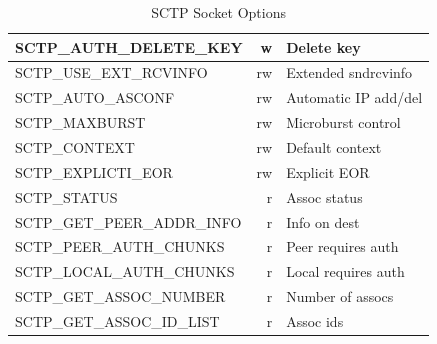\documentclass[conference]{IEEEtran}
\begin{document}
\begin{table}[h]
\begin{center}
\begin{tabular}{|l|r|l|}
SCTP\_AUTH\_DELETE\_KEY         & w   & Delete key               \\\hline
SCTP\_USE\_EXT\_RCVINFO         & rw  & Extended sndrcvinfo      \\\hline
SCTP\_AUTO\_ASCONF              & rw  & Automatic IP add/del     \\\hline
SCTP\_MAXBURST                  & rw  & Microburst control       \\\hline
SCTP\_CONTEXT                   & rw  & Default context          \\\hline
SCTP\_EXPLICTI\_EOR             & rw  & Explicit EOR             \\\hline
SCTP\_STATUS                    & r   & Assoc status             \\\hline
SCTP\_GET\_PEER\_ADDR\_INFO     & r   & Info on dest             \\\hline
SCTP\_PEER\_AUTH\_CHUNKS        & r   & Peer requires auth       \\\hline
SCTP\_LOCAL\_AUTH\_CHUNKS       & r   & Local requires auth      \\\hline
SCTP\_GET\_ASSOC\_NUMBER        & r   & Number of assocs         \\\hline
SCTP\_GET\_ASSOC\_ID\_LIST      & r   & Assoc ids                \\\hline
\end{tabular}
\end{center}
\caption{SCTP Socket Options\label{sockopt}}
\end{table}
\end{document}
